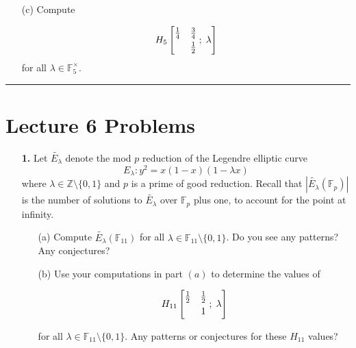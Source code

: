 \documentclass[12pt]{amsart}
\theoremstyle{definition}
\theoremstyle{remark}
\numberwithin{equation}{section}
\def \l {\lambda}
\def\F{{\mathbb F}}
\def\Z{{\mathbb Z}}
\def \l {\lambda}
\def\Z{\mathbb{Z}}
\def\F{\mathbb{F}}
\newcommand{\fp}
{\mathbb{F}_p}
\begin{document}
\begin{itemize}
\begin{itemize}
\begin{itemize}
\vspace{4mm}

\item[(c)] Compute 

$$H_{5}\left[\begin{matrix} \frac{1}{4} & \frac{3}{4} \smallskip \\   & \frac{1}{2} \end{matrix} \; ; \; \l \right]$$ for all $\l \in \mathbb{F}_{5}^{\times}$.
\end{itemize}

\vspace{8mm}

\hrule{}

\vspace{8mm}

\section*{Lecture 6 Problems}

\begin{itemize}
\item[\textbf{1.}] Let $\tilde{E_{\l}}$ denote the mod $p$ reduction of the Legendre elliptic curve 
$$E_{\l}: y^{2} = x(1-x)(1-\l x)$$ where $\l \in \Z \setminus \{0,1\}$ and $p$ is a prime of good reduction. Recall that $|\tilde{E_{\l}}(\fp)|$ is the number of solutions to $\tilde{E_{\l}}$ over $\fp$ plus one, to account for the point at infinity.

\vspace{4mm}

\begin{itemize}
\item[(a)] Compute $\tilde{E_{\l}}(\mathbb{F}_{11})$ for all $\l \in \F_{11} \setminus \{0,1\}$. Do you see any patterns? Any conjectures?

\vspace{4mm}

\item[(b)] Use your computations in part $(a)$ to determine the values of 

$$H_{11}\left[\begin{matrix} \frac{1}{2} & \frac{1}{2} \smallskip \\   & 1 \end{matrix} \; ; \; \l \right]$$

for all $\l \in \mathbb{F}_{11} \setminus \{0,1\}$. Any patterns or conjectures for these $H_{11}$ values?

\vspace{4mm}


\end{itemize}
\end{itemize}
\end{itemize}
\end{itemize}
\end{document}
